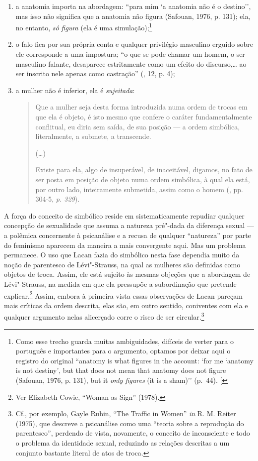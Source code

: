 \begin{enumerate}
\def\labelenumi{\arabic{enumi})}
\item
  a anatomia importa na abordagem: ``para mim `a anatomia não é o
  destino'', mas isso não significa que a anatomia não figura (Safouan,
  1976, p. 131); ela, no entanto, \emph{só figura} (ela é uma
  simulação);\footnote{Como esse trecho guarda muitas ambiguidades,
    difíceis de verter para o português e importantes para o argumento,
    optamos por deixar aqui o registro do original ``anatomy is what
    figures in the account: `for me `anatomy is not destiny', but that
    does not mean that anatomy does not figure (Safouan, 1976, p. 131),
    but it \emph{only figures} (it is a sham)'' (p.~44). {[}\versal{N.~T.}{]}}
\item
  o falo fica por sua própria conta e qualquer privilégio masculino
  erguido sobre ele corresponde a uma impostura; ``o que se pode chamar
  um homem, o ser masculino falante, desaparece estritamente como um
  efeito do discurso,\ldots{} ao ser inscrito nele apenas como castração''
  (, 12, p. 4);
\item
  a mulher não é inferior, ela é \emph{sujeitada}:
\begin{quote}
Que a mulher seja desta forma introduzida numa ordem de trocas em que
ela é objeto, é isto mesmo que confere o caráter fundamentalmente
conflitual, eu diria sem saída, de sua posição --- a ordem simbólica,
literalmente, a submete, a transcende.

(\ldots{})

Existe para ela, algo de insuperável, de inaceitável, digamos, no fato
de ser posta em posição de objeto numa ordem simbólica, à qual ela está,
por outro lado, inteiramente submetida, assim como o homem (, pp.
304-5, \emph{p. 329}).
\end{quote}
\end{enumerate}

A força do conceito de simbólico reside em sistematicamente repudiar
qualquer concepção de sexualidade que assuma a natureza pré"-dada da
diferença sexual --- a polêmica concernente à psicanálise e a recusa de
qualquer ``natureza'' por parte do feminismo aparecem da maneira a mais
convergente aqui. Mas um problema permanece. O uso que Lacan fazia do
simbólico nesta fase dependia muito da noção de parentesco de
Lévi"-Strauss, na qual as mulheres são definidas como objetos de troca.
Assim, ele está sujeito às mesmas objeções que a abordagem de
Lévi"-Strauss, na medida em que ela pressupõe a subordinação que pretende
explicar.\footnote{Ver Elizabeth Cowie, ``Woman as Sign'' (1978).}
Assim, embora à primeira vista essas observações de Lacan pareçam mais
críticas da ordem descrita, elas são, em outro sentido, coniventes com
ela e qualquer argumento nelas alicerçado corre o risco de ser
circular.\footnote{Cf., por exemplo, Gayle Rubin, ``The Traffic in Women''
  \emph{in} R. M. Reiter (1975), que descreve a psicanálise como uma
  ``teoria sobre a reprodução do parentesco'', perdendo de vista,
  novamente, o conceito de inconsciente e todo o problema da identidade
  sexual, reduzindo as relações descritas a um conjunto bastante literal
  de atos de troca.}

